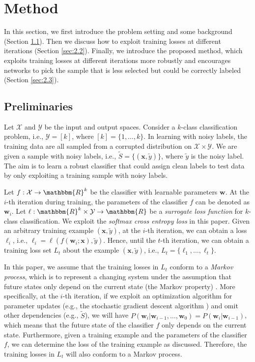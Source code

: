 \documentclass[11pt]{article}
\begin{document}
\section{Method}\label{sec:2}
In this section, we first introduce the problem setting and some background (Section \ref{sec:2.1}). Then we discuss how to exploit training losses at different iterations (Section \ref{sec:2.2}). Finally, we introduce the proposed method, which exploits training losses at different iterations more robustly and encourages networks to pick the sample that is less selected but could be correctly labeled (Section \ref{sec:2.3}). 
\vspace{-5pt}
\subsection{Preliminaries}\label{sec:2.1}
Let $\mathcal{X}$ and $\mathcal{Y}$ be the input and output spaces. Consider a $k$-class classification problem, i.e., $\mathcal{Y}=[k]$, where $[k]=\{1,\ldots,k\}$. In learning with noisy labels, the training data are all sampled from a corrupted distribution on $\mathcal{X}\times\mathcal{Y}$. We are given a sample with noisy labels, i.e., $\tilde{S}=\{(\mathbf{x},\tilde{y})\}$, where $\tilde{y}$ is the noisy label. The aim is to learn a robust classifier that could assign clean labels to test data by only exploiting a training sample with noisy labels.

Let $f:\mathcal{X}\rightarrow\mathbbm{R}^k$ be the classifier with learnable parameters $\mathbf{w}$. At the $i$-th iteration during training, the parameters of the classifier $f$ can be denoted as $\mathbf{w}_i$. Let $\ell:\mathbbm{R}^k\times\mathcal{Y}\rightarrow \mathbbm{R}$ be a \textit{surrogate loss function} for $k$-class classification. We exploit the \textit{softmax cross entropy loss} in this paper. Given an arbitrary training example $(\mathbf{x},\tilde{y})$, at the $i$-th iteration, we can obtain a loss $\ell_i$, i.e., $\ell_i=\ell(f(\mathbf{w}_i;\mathbf{x}),\tilde{y})$. Hence, until the $t$-th iteration, we can obtain a training loss set $L_t$ about the example $(\mathbf{x},\tilde{y})$, i.e., $L_t=\{\ell_1,\ldots,\ell_t\}$.

In this paper, we assume that the training losses in $L_t$ conform to a \textit{Markov process}, which is to represent a changing system under the assumption that future states only depend on the current state (the Markov property) \citep{rosenthal1997faithful}. More specifically, at the $i$-th iteration, if we exploit an optimization algorithm for parameter updates (e.g., the stochastic gradient descent algorithm \citep{bottou2012stochastic}) and omit other dependencies (e.g., $\tilde{S}$), we will have $P(\mathbf{w}_i|\mathbf{w}_{i-1},\ldots,\mathbf{w}_{0})=P(\mathbf{w}_i|\mathbf{w}_{i-1})$, which means that the future state of the classifier $f$ only depends on the current state. Furthermore, given a training example and the parameters of the classifier $f$, we can determine the loss of the training example as discussed. Therefore, the training losses in $L_t$ will also conform to a Markov process.
\end{document}
